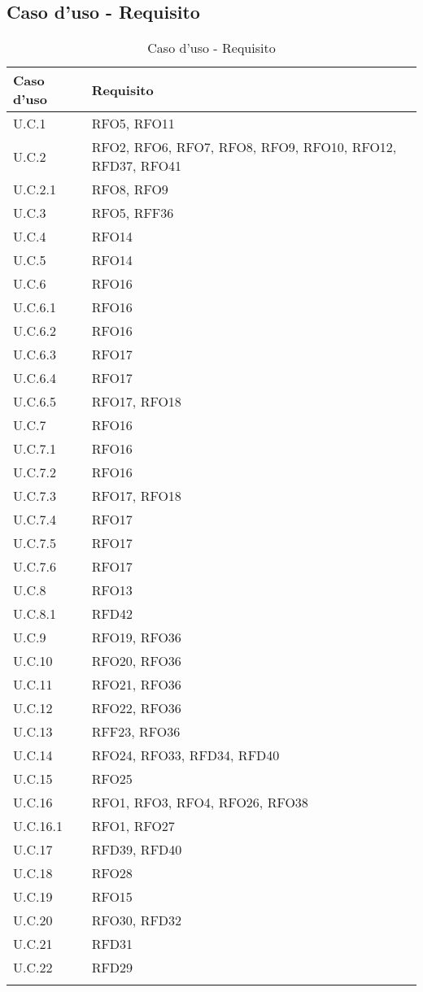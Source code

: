 \subsection{Caso d'uso - Requisito}
\begin{longtable}{|>{\centering\arraybackslash}m{}|>{\centering\arraybackslash}m{}|}
	\hline
	\textbf{Caso d'uso} & \textbf{Requisito}\\
	\endfirsthead
	\hline
	U.C.1 & RFO5, RFO11 \\
	\hline
	U.C.2 & RFO2, RFO6, RFO7, RFO8, RFO9, RFO10, RFO12, RFD37, RFO41 \\
	\hline
	U.C.2.1 & RFO8, RFO9 \\
	\hline
	U.C.3 & RFO5, RFF36 \\
	\hline
	U.C.4 & RFO14\\
	\hline
	U.C.5 & RFO14\\
	\hline
	U.C.6 & RFO16\\
	\hline
	U.C.6.1 & RFO16\\
	\hline
	U.C.6.2 & RFO16\\
	\hline
	U.C.6.3 & RFO17\\
	\hline
	U.C.6.4 & RFO17\\
	\hline
	U.C.6.5 & RFO17, RFO18\\
	\hline
	U.C.7 & RFO16\\
	\hline
	U.C.7.1 & RFO16\\
	\hline
	U.C.7.2 & RFO16\\
	\hline
	U.C.7.3 & RFO17, RFO18\\
	\hline
	U.C.7.4 & RFO17\\
	\hline
	U.C.7.5 & RFO17\\
	\hline
	U.C.7.6 & RFO17\\
	\hline
	U.C.8 & RFO13\\
	\hline
	U.C.8.1 & RFD42 \\
	\hline
	U.C.9 & RFO19, RFO36\\
	\hline
	U.C.10 & RFO20, RFO36\\
	\hline
	U.C.11 & RFO21, RFO36\\
	\hline
	U.C.12 & RFO22, RFO36\\
	\hline
	U.C.13 & RFF23, RFO36 \\
	\hline
	U.C.14 & RFO24, RFO33, RFD34, RFD40\\
	\hline
	U.C.15 & RFO25\\
	\hline
	U.C.16 & RFO1, RFO3, RFO4, RFO26, RFO38 \\
	\hline
	U.C.16.1 & RFO1, RFO27\\
	\hline
	U.C.17 & RFD39, RFD40\\
	\hline
	U.C.18 & RFO28\\
	\hline
	U.C.19 & RFO15\\
	\hline
	U.C.20 & RFO30, RFD32\\
	\hline
	U.C.21 & RFD31\\
	\hline
	U.C.22 & RFD29\\
	\hline
	\caption{Caso d'uso - Requisito}
\end{longtable}